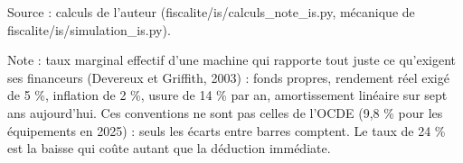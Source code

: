 Source : calculs de l'auteur (fiscalite/is/calculs\_note\_is.py, mécanique de fiscalite/is/simulation\_is.py).\par Note : taux marginal effectif d'une machine qui rapporte tout juste ce qu'exigent ses financeurs (Devereux et Griffith, 2003) : fonds propres, rendement réel exigé de 5 \%, inflation de 2 \%, usure de 14 \% par an, amortissement linéaire sur sept ans aujourd'hui. Ces conventions ne sont pas celles de l'OCDE (9,8 \% pour les équipements en 2025) : seuls les écarts entre barres comptent. Le taux de 24 \% est la baisse qui coûte autant que la déduction immédiate.
